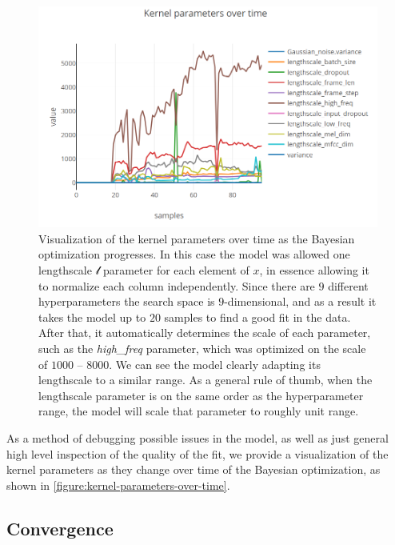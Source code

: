 \begin{figure}
	\begin{center}
		\includegraphics[width=1.0\textwidth]{images/kernel-params-over-time.png}
		\caption{Visualization of the kernel parameters over time as the Bayesian optimization progresses. In this case the model was allowed one lengthscale $\mathcal{l}$ parameter for each element of $x$, in essence allowing it to normalize each column independently. Since there are $9$ different hyperparameters the search space is $9$-dimensional, and as a result it takes the model up to $20$ samples to find a good fit in the data. After that, it automatically determines the scale of each parameter, such as the \emph{high\_freq} parameter, which was optimized on the scale of $1000$ -- $8000$. We can see the model clearly adapting its lengthscale to a similar range. As a general rule of thumb, when the lengthscale parameter is on the same order as the hyperparameter range, the model will scale that parameter to roughly unit range.}
	\end{center}
\end{figure}
\label{figure:kernel-parameters-over-time}

As a method of debugging possible issues in the model, as well as just general high level inspection of the quality of the fit, we provide a visualization of the kernel parameters as they change over time of the Bayesian optimization, as shown in \autoref{figure:kernel-parameters-over-time}.


\subsection{Convergence}

